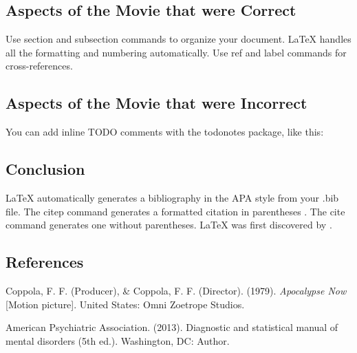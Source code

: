 \documentclass[a4paper,man,natbib]{apa6}
\begin{document}
\subsection{Aspects of the Movie that were Correct}

Use section and subsection commands to organize your document. \LaTeX{} handles all the formatting and numbering automatically. Use ref and label commands for cross-references.

\subsection{Aspects of the Movie that were Incorrect}

You can add inline TODO comments with the todonotes package, like this:

\subsection{Conclusion}

LaTeX automatically generates a bibliography in the APA style from your .bib file. The citep command generates a formatted citation in parentheses \citep{Lamport1986}. The cite command generates one without parentheses. LaTeX was first discovered by \cite{Lamport1986}.

\pagebreak
\maketitle

\subsection{References}
Coppola, F. F. (Producer), \& Coppola, F. F. (Director). (1979). \textit{Apocalypse Now} [Motion picture]. United States: Omni Zoetrope Studios.

American Psychiatric Association. (2013). Diagnostic and statistical manual of mental disorders (5th ed.). Washington, DC: Author.
\end{document}
